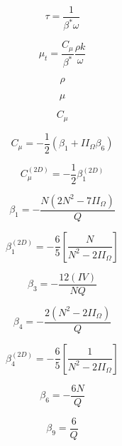 \begin{equation}
\tau = \frac{1}{\beta^* \omega}
\end{equation}

\begin{equation}
\mu_t = \frac{C_{\mu}}{\beta^*} \frac{\rho k}{\omega}
\end{equation}

\begin{equation}
\rho
\end{equation}

\begin{equation}
\mu
\end{equation}

\begin{equation}
C_{\mu}
\end{equation}

\begin{equation}
C_{\mu} = -\frac{1}{2} \left( \beta_1 + II_{\Omega} \beta_6 \right)
\end{equation}

\begin{equation}
C_{\mu}^{(2D)} = -\frac{1}{2} \beta_1^{(2D)}
\end{equation}

\begin{equation}
\beta_1 = - \frac{N \left( 2 N^2 - 7 II_{\Omega} \right)}{Q}
\end{equation}

\begin{equation}
\beta_1^{(2D)} = - \frac{6}{5} \left[\frac{N}{N^2 - 2 II_{\Omega} } \right]
\end{equation}

\begin{equation}
\beta_3 = - \frac{12 (IV)}{NQ}
\end{equation}

\begin{equation}
\beta_4 = - \frac{2 \left( N^2 - 2 II_{\Omega} \right)}{Q}
\end{equation}

\begin{equation}
\beta_4^{(2D)} = - \frac{6}{5} \left[\frac{1}{N^2 - 2 II_{\Omega} } \right]
\end{equation}

\begin{equation}
\beta_6 = - \frac{6 N}{Q}
\end{equation}

\begin{equation}
\beta_9 = \frac{6}{Q}
\end{equation}

